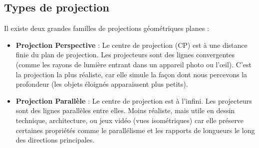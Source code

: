 \subsection{Types de projection}
Il existe deux grandes familles de projections géométriques planes :
\begin{itemize}
    \item \textbf{Projection Perspective} : Le centre de projection (CP) est à une distance finie du plan de projection. Les projecteurs sont des lignes convergentes (comme les rayons de lumière entrant dans un appareil photo ou l'œil). C'est la projection la plus réaliste, car elle simule la façon dont nous percevons la profondeur (les objets éloignés apparaissent plus petits).
    \item \textbf{Projection Parallèle} : Le centre de projection est à l'infini. Les projecteurs sont des lignes parallèles entre elles. Moins réaliste, mais utile en dessin technique, architecture, ou jeux vidéo (vues isométriques) car elle préserve certaines propriétés comme le parallélisme et les rapports de longueurs le long des directions principales.
\end{itemize}
